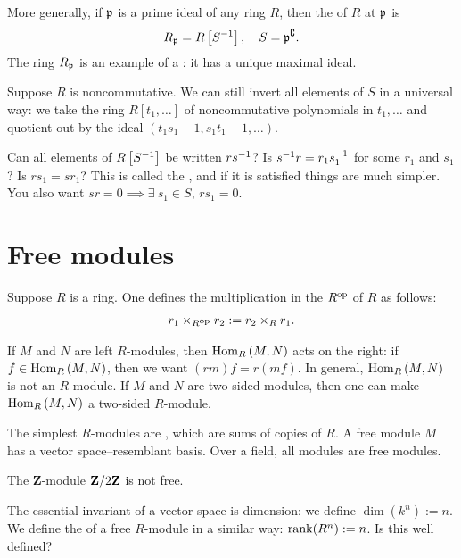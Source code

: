 \documentclass[11pt, oneside,margin=1in]{article}
\begin{document}
More generally, if $\mathfrak p$ is a prime ideal of any ring $R$, then the  of $R$ at $\mathfrak p$ is
$$
R_{\mathfrak p} = R\left[ S^{-1}\right], \quad S = {\mathfrak p}^\complement.
$$
The ring $R_{\mathfrak p} $ is an example of a : it has a unique maximal ideal.

Suppose $R$ is noncommutative. We can still invert all elements of $S$ in a universal way: we take the ring $R[t_1,\hdots]$ of noncommutative polynomials in $t_1,\hdots$ and quotient out by the ideal $(t_1s_1 - 1, s_1t_1 -1,\hdots)$. 

Can all elements of $R\left[S^{-1}\right]$ be written $rs^{-1}$? Is $s^{-1} r = r_1s_1^{-1}$ for some $r_1$ and $s_1$? Is $rs_1 =sr_1$? This is called the , and if it is satisfied things are much simpler. You also want $sr=0\implies \exists\: s_1 \in S,\, rs_1=0$.

\section{Free modules}
Suppose $R$ is a ring. One defines the multiplication in the  $R\textsuperscript{op}$ of $R$ as follows:
\begin{align*}
	r_1 \times_{R\textsuperscript{op}} r_2 := r_2 \times_R r_1.
\end{align*}

If $M$ and $N$ are left $R$-modules, then $\operatorname{Hom}_R\left( M,N \right) $ acts on the right: if $f\in\operatorname{Hom}_R\left( M,N \right)$, then we want $\left( rm \right) f=r\left( mf \right) $. In general, $\operatorname{Hom}_R\left( M,N \right) $ is not an $R$-module. If $M$ and $N$ are two-sided modules, then one can make $\operatorname{Hom}_R\left( M,N \right) $ a two-sided $R$-module. 

The simplest $R$-modules are , which are sums of copies of $R$. A free module $M$ has a vector space--resemblant basis. Over a field, all modules are free modules. 
\begin{example}\label{}
The $\mathbf{Z}$-module $\mathbf Z / 2\mathbf Z$ is not free.
\end{example}

The essential invariant of a vector space is dimension: we define $\dim(k^n):= n$. We define the  of a free $R$-module in a similar way: $\operatorname{rank} (R^n):= n$. Is this well defined?
\end{document}
